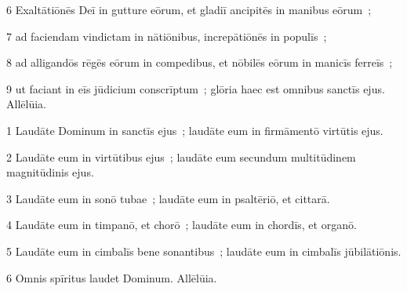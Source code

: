 \psalmVerse
  {\phantom{00}6}
  {Exaltātiōnēs Deī in gutture eōrum, et gladiī ancipitēs in manibus eōrum~;}


\psalmVerse
  {\phantom{00}7}
  {ad faciendam vindictam in nātiōnibus, increpātiōnēs in populīs~;}


\psalmVerse
  {\phantom{00}8}
  {ad alligandōs rēgēs eōrum in compedibus, et nōbilēs eōrum in manicīs ferreīs~;}


\psalmVerse
  {\phantom{00}9}
  {ut faciant in eīs jūdicium conscrīptum~; glōria haec est omnibus sanctīs ejus. Allēlūia.}



\psalmVerse
  {\phantom{00}1}
  {Laudāte Dominum in sanctīs ejus~; laudāte eum in firmāmentō virtūtis ejus.}


\psalmVerse
  {\phantom{00}2}
  {Laudāte eum in virtūtibus ejus~; laudāte eum secundum multitūdinem magnitūdinis ejus.}


\psalmVerse
  {\phantom{00}3}
  {Laudāte eum in sonō tubae~; laudāte eum in psaltēriō, et cittarā.}


\psalmVerse
  {\phantom{00}4}
  {Laudāte eum in timpanō, et chorō~; laudāte eum in chordīs, et organō.}


\psalmVerse
  {\phantom{00}5}
  {Laudāte eum in cimbalīs bene sonantibus~; laudāte eum in cimbalīs jūbilātiōnis.}


\psalmVerse
  {\phantom{00}6}
  {Omnis spīritus laudet Dominum. Allēlūia.}




